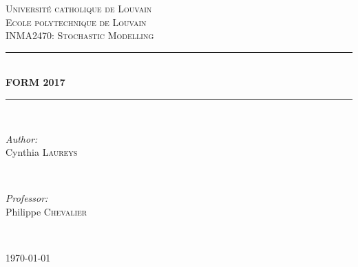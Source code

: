 \documentclass[paper=a4,fontsize=8pt,pagesize,DIV=calc]{scrartcl}
\begin{document}
\begin{titlepage}
\center

\newcommand{\HRule}{\rule{\linewidth}{0.5mm}}
 

\textsc{\Huge Université catholique de Louvain}\\[1.5cm]
\textsc{\Huge Ecole polytechnique de Louvain}\\[0.5cm]
\textsc{\Large INMA2470: Stochastic Modelling}\\[5cm]


\HRule \\[0.4cm]
{ \huge \bfseries FORM 2017}\\[0.4cm]
\HRule \\[1.5cm]
 

\begin{minipage}{0.4\textwidth}
\begin{flushleft} \large
\emph{Author:}\\
Cynthia \textsc{Laureys}
\end{flushleft}
\end{minipage}
~
\begin{minipage}{0.4\textwidth}
\begin{flushright} \large
\emph{Professor:} \\
Philippe \textsc{Chevalier}
\end{flushright}
\end{minipage}\\[5cm]


\vfill

{\large \today}\\[3cm]

\end{titlepage}
\end{document}
